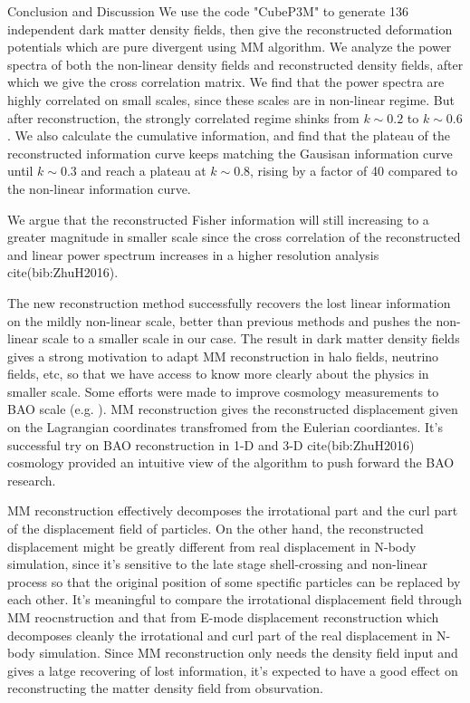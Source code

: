 \begin{section}{Conclusion and Discussion}
 \label{sec:conclusion}
    We use the code "CubeP3M" to generate 136 independent dark matter density fields, 
then give the reconstructed deformation potentials which are pure divergent using MM 
algorithm. We analyze the power spectra of both the non-linear density fields and 
reconstructed density fields, after which we give the cross correlation matrix. We find that the power 
spectra are highly correlated on small scales, since these scales are in non-linear 
regime. But after reconstruction, the strongly correlated regime shinks from $k\sim0.2$ 
to $k\sim0.6$. We also calculate the cumulative information, and find that the plateau 
of the reconstructed information curve keeps matching the Gausisan information curve until 
$k \sim 0.3$ and reach a plateau at $k \sim 0.8$, rising by a factor of 40 compared to the 
non-linear information curve.

   We argue that the reconstructed Fisher information will still increasing to a greater magnitude in smaller scale 
since the cross correlation of the reconstructed and linear power spectrum increases 
in a higher resolution analysis cite(bib:ZhuH2016).

   The new reconstruction method successfully recovers the lost linear information on 
the mildly non-linear scale, better than previous methods 
\cite{bib:Mark2006,bib:Mark2009,bib:Zhang2011,bib:Yu2012,bib:Mark2014} and pushes the 
non-linear scale to a smaller scale in our case. The result in dark matter density fields 
gives a strong motivation to adapt MM reconstruction in halo fields, neutrino fields, etc, so that 
we have access to know more clearly about the physics in smaller scale. Some efforts were 
made to improve cosmology measurements to BAO scale (e.g. \cite{bib:Daniel2007,bib:Martin2015}). 
MM reconstruction gives the reconstructed displacement given on the Lagrangian coordinates transfromed from the 
Eulerian coordiantes. It's successful try on BAO reconstruction in 1-D 
\cite{bib:Zhu2016} and 3-D cite(bib:ZhuH2016) cosmology provided an intuitive view of the algorithm 
to push forward the BAO research.

   MM reconstruction effectively decomposes the irrotational part and the curl part of the displacement 
field of particles.
On the other hand, the reconstructed displacement might be greatly different from real displacement in N-body 
simulation, since it's sensitive to the late stage shell-crossing and non-linear process so that the original 
position of some spectific particles can be replaced by each other. It's meaningful to compare the irrotational 
displacement field through MM reocnstruction and that from E-mode displacement reconstruction \cite{bib:Yu2016} 
which decomposes cleanly the irrotational and curl part of the real displacement in N-body simulation. 
Since MM reconstruction only needs the density field input and gives a latge recovering of lost information, 
it's expected to have a good effect on reconstructing the matter density field from obsurvation.
\end{section}
